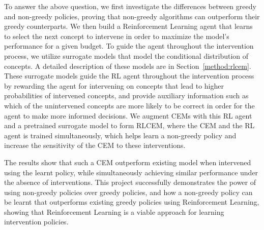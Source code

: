 \documentclass[../main.tex]{subfiles}
\begin{document}
To answer the above question, we first investigate the differences between greedy and non-greedy policies,
proving that non-greedy algorithms can outperform
their greedy counterparts. We then build a Reinforcement Learning agent
that learns to select the next concept to intervene in order to maximize the model's performance for a given budget.
To guide the agent throughout the intervention process, we utilize surrogate models that model
the conditional distribution of concepts. A detailed description of these models are in Section~\ref{method:rlcem}.
These surrogate models guide the RL agent throughout the intervention
process by rewarding the agent for intervening on concepts that lead to higher probabilities of
intervened concepts, and provide auxiliary information such as which of the unintervened concepts 
are more likely to be correct in order for the agent to make more informed decisions.
We augment CEMs with this RL agent and a pretrained surrogate model to form RLCEM, 
where the CEM and the RL agent is trained simultaneously, which helps learn a non-greedy policy
and increase the sensitivity of the CEM to these interventions.

The results show that such a CEM
outperform existing model when intervened using the learnt policy, while simultaneously achieving 
similar performance
under the absence of interventions. This project successfully demonstrates the power of using
non-greedy policies over greedy policies, and how a non-greedy policy can be learnt that 
outperforms existing greedy policies using Reinforcement Learning, showing that Reinforcement Learning
is a viable approach for learning intervention policies.
\end{document}
